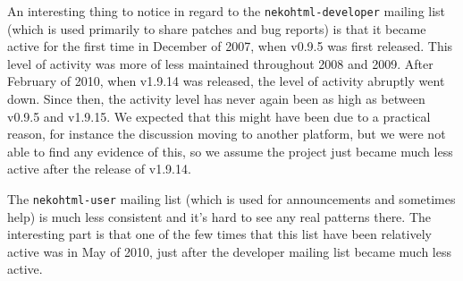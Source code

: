 An interesting thing to notice in regard to the \texttt{nekohtml-developer} mailing list (which is used primarily to share patches and bug reports) is that it became active for the first time in December of 2007, when v0.9.5 was first released.
This level of activity was more of less maintained throughout 2008 and 2009.
After February of 2010, when v1.9.14 was released, the level of activity abruptly went down.
Since then, the activity level has never again been as high as between v0.9.5 and v1.9.15.
We expected that this might have been due to a practical reason, for instance the discussion moving to another platform, but we were not able to find any evidence of this, so we assume the project just became much less active after the release of v1.9.14.

The \texttt{nekohtml-user} mailing list (which is used for announcements and sometimes help) is much less consistent and it's hard to see any real patterns there.
The interesting part is that one of the few times that this list have been relatively active was in May of 2010, just after the developer mailing list became much less active.
